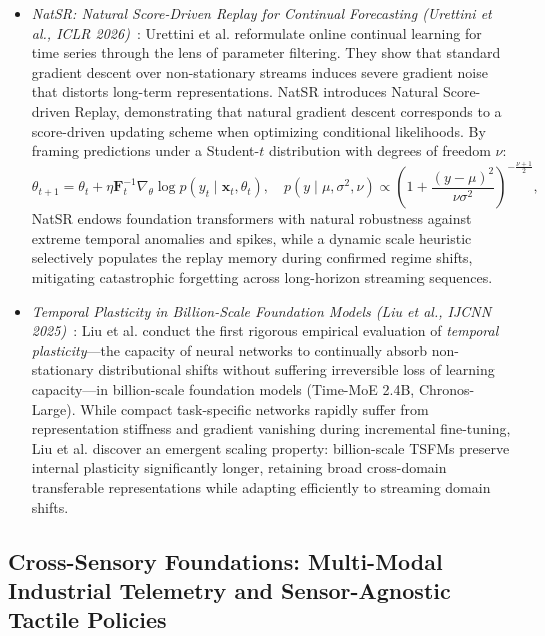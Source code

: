 \begin{itemize}[leftmargin=*]
    \item \emph{NatSR: Natural Score-Driven Replay for Continual Forecasting (Urettini et al., ICLR 2026)}~\cite{urettini2026natsr}: Urettini et al. reformulate online continual learning for time series through the lens of parameter filtering. They show that standard gradient descent over non-stationary streams induces severe gradient noise that distorts long-term representations. NatSR introduces Natural Score-driven Replay, demonstrating that natural gradient descent corresponds to a score-driven updating scheme when optimizing conditional likelihoods. By framing predictions under a Student-$t$ distribution with degrees of freedom $\nu$:
    \begin{equation}
        \theta_{t+1} = \theta_t + \eta \mathbf{F}_t^{-1} \nabla_\theta \log p(y_t \mid \mathbf{x}_t, \theta_t), \quad p(y \mid \mu, \sigma^2, \nu) \propto \left(1 + \frac{(y - \mu)^2}{\nu \sigma^2}\right)^{-\frac{\nu+1}{2}},
    \end{equation}
    NatSR endows foundation transformers with natural robustness against extreme temporal anomalies and spikes, while a dynamic scale heuristic selectively populates the replay memory during confirmed regime shifts, mitigating catastrophic forgetting across long-horizon streaming sequences.

    \item \emph{Temporal Plasticity in Billion-Scale Foundation Models (Liu et al., IJCNN 2025)}~\cite{liu2025temporalplasticity}: Liu et al. conduct the first rigorous empirical evaluation of \emph{temporal plasticity}—the capacity of neural networks to continually absorb non-stationary distributional shifts without suffering irreversible loss of learning capacity—in billion-scale foundation models (Time-MoE 2.4B, Chronos-Large). While compact task-specific networks rapidly suffer from representation stiffness and gradient vanishing during incremental fine-tuning, Liu et al. discover an emergent scaling property: billion-scale TSFMs preserve internal plasticity significantly longer, retaining broad cross-domain transferable representations while adapting efficiently to streaming domain shifts.
\end{itemize}

\subsection{Cross-Sensory Foundations: Multi-Modal Industrial Telemetry and Sensor-Agnostic Tactile Policies}
\label{sec:cross_sensory_tactile_industrial}

